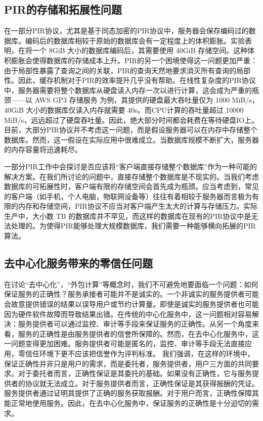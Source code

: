 \subsection{PIR的存储和拓展性问题}
在一部分PIR协议，尤其是基于同态加密的PIR协议中，服务器会保存编码过的数据库。编码后的数据库相较于原始的数据库会有一定程度上的体积膨胀。实验表明，在将一个 8GiB 大小的数据库编码后，其需要使用 40GiB 存储空间\cite{SimplePIR}。这种体积膨胀会使得数据库的存储成本上升。PIR的另一个困境使得这一问题更加严重：由于局部性暴露了查询之间的关联，PIR的查询天然地要求消灭所有查询的局部性。因此，缓存机制对于PIR的效率提升几乎没有帮助。在线性复杂度的PIR协议中，服务器需要将整个数据库从硬盘读入内存一次以进行计算，这会成为严重的瓶颈——以 AWS GP3 存储服务 \cite{AWSEBSGP} 为例，其提供的硬盘最大吞吐量仅为 1000 MiB/s，40GiB 大小的数据库仅读入内存就需要 40s。而CPU计算的吞吐量超过 10000 MiB/s，远远超过了硬盘吞吐量。因此，绝大部分时间都会耗费在等待硬盘IO上。目前，大部分PIR协议并不考虑这一问题，而是假设服务器可以在内存中存储整个数据库。然而，这一假设在实际应用中很难成立。当数据库规模不断扩大，服务器的内存容量将迅速耗尽。

一部分PIR工作中会探讨是否应该将“客户端直接存储整个数据库”作为一种可能的解决方案。在我们所讨论的问题中，直接存储整个数据库是不现实的。当我们考虑数据库的可拓展性时，客户端有限的存储空间会首先成为瓶颈。应当考虑到，常见的客户端（如手机，个人电脑，物联网设备等）往往有着相较于服务器而言极为有限的内存和存储空间，PIR协议不应当对客户端产生太大的计算与存储压力。实际生产中，大小数 TB 的数据库并不罕见，而这样的数据库在现有的PIR协议中是无法处理的。为使得PIR能够处理大规模数据库，我们需要一种能够横向拓展的PIR算法。

\subsection{去中心化服务带来的零信任问题}
在讨论“去中心化”，“外包计算”等概念时，我们不可避免地要面临一个问题：如何保证服务的正确性？服务承接者可能并不是诚实的。一个非诚实的服务提供者可能会故意提供错误的结果以误导用户或节约计算量。即使是诚实的服务提供者也可能因为硬件软件故障而导致结果出错。在传统的中心化服务中，这一问题相对容易解决：服务提供者可以通过监控、审计等手段来保证服务的正确性。从另一个角度来看，服务的正确性是由服务提供者的信誉所保障的。然而，在去中心化服务中，这一问题变得更加困难。服务提供者可能是匿名的，监控、审计等手段无法直接应用，零信任环境下更不应该把信誉作为评判标准。
我们强调，在这样的环境中，保证正确性并非只是用户的需求，而是委托者，服务提供者，用户三方面的共同要求。对于委托者而言，正确性保证是其委托的基础。如果没有正确性，它与服务提供者的协议就无法成立。对于服务提供者而言，正确性保证是其获得报酬的凭证。服务提供者通过证明其提供了正确的服务获取报酬。对于用户而言，正确性保障其能正常地使用服务。因此，在去中心化服务中，保证服务的正确性是十分迫切的需求。

